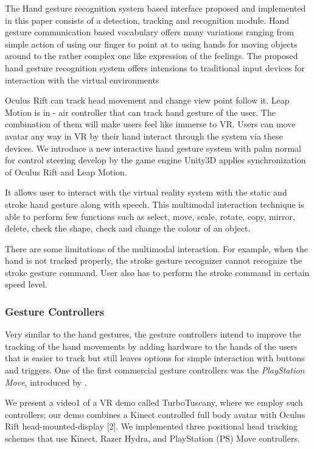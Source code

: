 The Hand gesture recognition system based interface proposed and implemented in this paper consists of a detection, tracking and recognition module.
Hand gesture communication based vocabulary offers many variations ranging from simple action of using our finger to point at to using hands for moving objects around to the rather complex one like expression of the feelings. The proposed hand gesture recognition system offers intensions to traditional input devices for interaction with the virtual environments
\cite{Rautaray2011}

Oculus Rift can track head movement and change view point follow it. Leap Motion is in - air controller that can track hand gesture of the user. The combination of them will make users feel like immerse to VR. Users can move avatar any way in VR by their hand interact through the system via these devices. We introduce a new interactive hand gesture system with palm normal for control steering develop by the game engine Unity3D applies synchronization of Oculus Rift and Leap Motion.
\cite{Khundam2015a}

It allows user to interact with the virtual reality system with the static and stroke hand gesture along with speech. This multimodal interaction technique is able to perform few functions such as select, move, scale, rotate, copy, mirror, delete, check the shape, check and change the colour of an object.
\cite{Chun2015}

There are some limitations of the multimodal interaction. For example, when the hand is not tracked properly, the stroke gesture recognizer cannot recognize the stroke gesture command. User also has to perform the stroke command in certain speed level.
\cite{Chun2015}


\subsubsection{Gesture Controllers}

Very similar to the hand gestures, the gesture controllers intend to improve the tracking of the hand movements by adding hardware to the hands of the users that is easier to track but still leaves options for simple interaction with buttons and triggers. \newline
One of the first commercial gesture controllers was the \textit{PlayStation Move}, introduced by \cite{Sony2010}.

We present a video1 of a VR demo called TurboTuscany, where we employ such controllers; our demo combines a Kinect controlled full body avatar with Oculus Rift head-mounted-display [2]. We implemented three positional head tracking schemes that use Kinect, Razer Hydra, and PlayStation (PS) Move controllers.
\cite{Takala2014}

